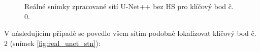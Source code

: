 \begin{figure}[H]
\centering

\newcommand{\subfiguresize}{.15\textwidth}
\newcommand{\imagewidth}{1.0in}
\newcommand{\hspacesize}{.00in}

\newcommand{\insertimage}[1]{%
  \begin{minipage}{\imagewidth}
    \centering
    \texttt{[image: \#1]}
  \end{minipage}
}

\hspace{\hspacesize}%
\hspace{\hspacesize}%
\caption[Reálné snímky zpracované sítí U-Net++ bez HS]
{Reálné snímky zpracované sítí U-Net++ bez HS pro klíčový bod č. 0.}
\label{fig:real_unet_ppa}
\end{figure}

V následujícím případě se povedlo všem sítím podobně lokalizovat klíčový bod č. 2 (snímek \ref{fig:real_unet_stn}):

